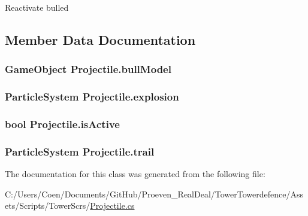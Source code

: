 Reactivate bulled 



\subsection{Member Data Documentation}
\subsubsection[{\texorpdfstring{bull\+Model}{bullModel}}]{\setlength{\rightskip}{0pt plus 5cm}Game\+Object Projectile.\+bull\+Model}\hypertarget{class_projectile_a9a0edaa8c8eaee9b5e8e8979b43e8752}{}\label{class_projectile_a9a0edaa8c8eaee9b5e8e8979b43e8752}
\subsubsection[{\texorpdfstring{explosion}{explosion}}]{\setlength{\rightskip}{0pt plus 5cm}Particle\+System Projectile.\+explosion}\hypertarget{class_projectile_a72e0cf3a5f104ca4508c71acc3a3b29d}{}\label{class_projectile_a72e0cf3a5f104ca4508c71acc3a3b29d}
\subsubsection[{\texorpdfstring{is\+Active}{isActive}}]{\setlength{\rightskip}{0pt plus 5cm}bool Projectile.\+is\+Active}\hypertarget{class_projectile_ac900a410e1793122901e6452f077bb4a}{}\label{class_projectile_ac900a410e1793122901e6452f077bb4a}
\subsubsection[{\texorpdfstring{trail}{trail}}]{\setlength{\rightskip}{0pt plus 5cm}Particle\+System Projectile.\+trail}\hypertarget{class_projectile_a0a258f946bd0b507f38d53040b06858b}{}\label{class_projectile_a0a258f946bd0b507f38d53040b06858b}


The documentation for this class was generated from the following file\+:\begin{DoxyCompactItemize}
\item 
C\+:/\+Users/\+Coen/\+Documents/\+Git\+Hub/\+Proeven\+\_\+\+Real\+Deal/\+Tower\+Towerdefence/\+Assets/\+Scripts/\+Tower\+Scr\textquotesingle{}s/\hyperlink{_projectile_8cs}{Projectile.\+cs}\end{DoxyCompactItemize}
